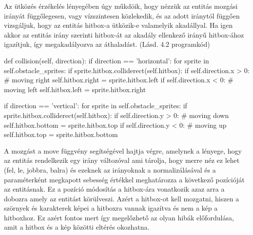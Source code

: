 Az ütközés érzékelés lényegében úgy műkdöik, hogy nézzük az entitás mozgási irányát függőlegesen, vagy vízszintesen közlekedik, és az adott iránytól függően vizsgáljuk, hogy az entitás hitbox-a ütközik-e valamelyik akadállyal. Ha igen akkor az entitás irány szerinti hitbox-át az akadály ellenkező irányű hitbox-ához igazítjuk, így megakadályozva az áthaladást. (Lásd. 4.2 programkód)
\begin{python}[caption={Ütközés kezelés},label=py:Ütközés kezelés]
    def collision(self, direction):
    if direction == 'horizontal':
    for sprite in self.obstacle_sprites:
    if sprite.hitbox.colliderect(self.hitbox):
    if self.direction.x > 0:
    # moving right
    self.hitbox.right = sprite.hitbox.left
    if self.direction.x < 0:
                        # moving left
                        self.hitbox.left = sprite.hitbox.right
                        
                        if direction == 'vertical':
                        for sprite in self.obstacle_sprites:
                        if sprite.hitbox.colliderect(self.hitbox):
                    if self.direction.y > 0:
                        # moving down
                        self.hitbox.bottom = sprite.hitbox.top
                        if self.direction.y < 0:
                        # moving up
                        self.hitbox.top = sprite.hitbox.bottom
                    \end{python}

A mozgást a move függvény segítségével hajtja végre, amelynek a lényege, hogy az entitás rendelkezik egy irány változóval ami tárolja, hogy merre néz ez lehet (fel, le, jobbra, balra) és ezeknek az irányoknak a normalizálásával és a paraméterként megkapott sebesség értékkel meghatározza a következő pozícióját az entitásnak. Ez a pozíció módosítás a hitbox-ára vonatkozik azaz arra a dobozra amely az entitást körülveszi. Azért a hitbox-ot kell mozgatni, hiszen a szörnyek és karakterek képei a hitboxra vannak igazítva és nem a kép a hitboxhoz. Ez azért fontos mert így megelőzhető az olyan hibák előfordulása, amit a hitbox és a kép közötti eltérés okozhatna.

                    
